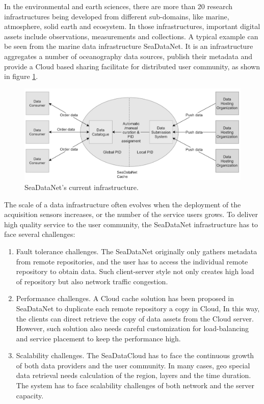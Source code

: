 \documentclass[conference]{IEEEtran}
\begin{document}
In the environmental and earth sciences, there are more than 20 research infrastructures being developed from different sub-domains, like marine, atmosphere, solid earth and ecosystem. In those infrastructures, important digital assets include observations, measurements and collections. A typical example can be seen from the marine data infrastructure SeaDataNet. It is an infrastructure aggregates a number of oceanography data sources, publish their metadata and provide a Cloud based sharing facilitate for distributed user community, as shown in figure \ref{fig:sdc_cur}. 
\begin{figure}[H]
\centering
\includegraphics[width=\columnwidth]{images/SDC_current.png}
\caption{SeaDataNet's current infrastructure.}
\label{fig:sdc_cur}
\end{figure}

The scale of a data infrastructure often evolves when the deployment of the acquisition sensors increases, or the number of the service users grows. To deliver high quality service to the user community, the SeaDataNet infrastructure has to face several challenges:
\begin{enumerate}
    \item Fault tolerance challenges. The SeaDataNet originally only gathers metadata from remote repositories, and the user has to access the individual remote repository to obtain data. Such client-server style not only creates high load of repository but also network traffic congestion.
    \item Performance challenges. A Cloud cache solution has been proposed in SeaDataNet to duplicate each remote repository a copy in Cloud, In this way, the clients can direct retrieve the copy of data assets from the Cloud server. However, such solution also needs careful customization for load-balancing and service placement to keep the performance high.
    \item Scalability challenges. The SeaDataCloud has to face the continuous growth of both data providers and the user community. In many cases, geo special data retrieval needs calculation of the region, layers and the time duration. The system has to face scalability challenges of both network and the server capacity. 
\end{enumerate}
\end{document}
